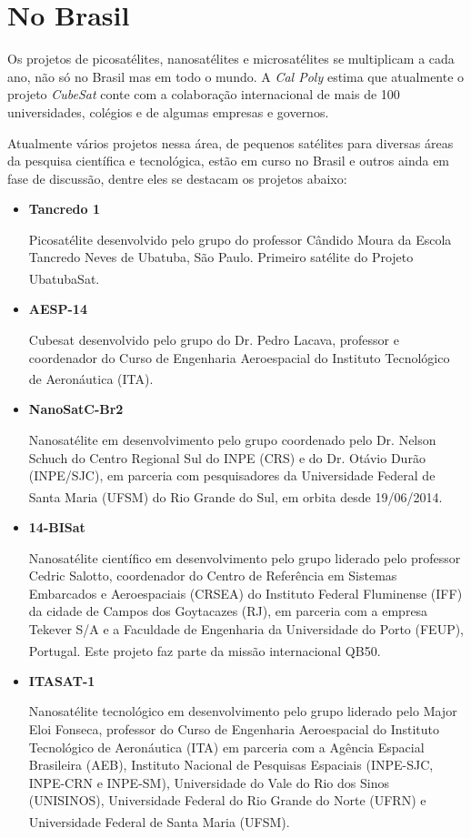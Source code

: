 \documentclass[
	12pt,				%
	openright,			%
	oneside,			%
	a4paper,			%
	english,			%
	french,				%
	spanish,			%
	brazil,				%
	oldfontcommands
	]{abntex2}
\begin{document}
\section[No Brasil]{No Brasil}

	Os projetos de picosatélites, nanosatélites e microsatélites se multiplicam a cada ano, não só no Brasil mas em todo o mundo. A \textit{Cal Poly} estima que atualmente o projeto \textit{CubeSat} conte com a colaboração internacional de mais de 100 universidades, colégios e de algumas empresas e governos.
	
	Atualmente vários projetos nessa área, de pequenos satélites para diversas áreas da pesquisa científica e tecnológica, estão em curso no Brasil e outros ainda em fase de discussão, dentre eles se destacam os projetos abaixo:
	
	\begin{itemize}
		\item \textbf{Tancredo 1}
		
			Picosatélite desenvolvido pelo grupo do professor Cândido Moura da Escola Tancredo Neves de Ubatuba, São Paulo. Primeiro satélite do Projeto UbatubaSat.\textsuperscript{\cite{UbatubaSat}}
			
		\item \textbf{AESP-14}		
		
			Cubesat desenvolvido pelo grupo do Dr. Pedro Lacava, professor e coordenador do Curso de Engenharia Aeroespacial do Instituto Tecnológico de Aeronáutica (ITA).\textsuperscript{\cite{AESP14}}
			
		\item \textbf{NanoSatC-Br2}
		
			Nanosatélite em desenvolvimento pelo grupo coordenado pelo Dr. Nelson Schuch do Centro Regional Sul do INPE (CRS) e do Dr. Otávio Durão (INPE/SJC), em parceria com pesquisadores da Universidade Federal de Santa Maria (UFSM) do Rio Grande do Sul, em orbita desde 19/06/2014.\textsuperscript{\cite{INPE}}

		\item \textbf{14-BISat}

			Nanosatélite científico em desenvolvimento pelo grupo liderado pelo professor Cedric Salotto, coordenador do Centro de Referência em Sistemas Embarcados e Aeroespaciais (CRSEA) do Instituto Federal Fluminense (IFF) da cidade de Campos dos Goytacazes (RJ), em parceria com a empresa Tekever S/A e a Faculdade de Engenharia da Universidade do Porto (FEUP), Portugal. Este projeto faz parte da missão internacional QB50.\textsuperscript{\cite{IFF}}
			
		\item \textbf{ITASAT-1}	

			Nanosatélite tecnológico em desenvolvimento pelo grupo liderado pelo Major Eloi Fonseca, professor do Curso de Engenharia Aeroespacial do Instituto Tecnológico de Aeronáutica (ITA) em parceria com a Agência Espacial Brasileira (AEB), Instituto Nacional de Pesquisas Espaciais (INPE-SJC, INPE-CRN e INPE-SM), Universidade do Vale do Rio dos Sinos (UNISINOS), Universidade Federal do Rio Grande do Norte (UFRN) e Universidade Federal de Santa Maria (UFSM).\textsuperscript{\cite{ITASAT}}	
			
	\end{itemize}
\end{document}
